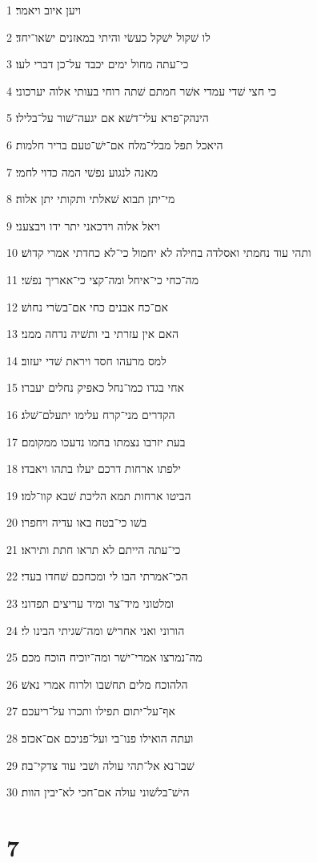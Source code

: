 \par 1 ויען איוב ויאמר׃
\par 2 לו שׁקול ישׁקל כעשׂי והיתי במאזנים ישׂאו־יחד׃
\par 3 כי־עתה מחול ימים יכבד על־כן דברי לעו׃
\par 4 כי חצי שׁדי עמדי אשׁר חמתם שׁתה רוחי בעותי אלוה יערכוני׃
\par 5 הינהק־פרא עלי־דשׁא אם יגעה־שׁור על־בלילו׃
\par 6 היאכל תפל מבלי־מלח אם־ישׁ־טעם בריר חלמות׃
\par 7 מאנה לנגוע נפשׁי המה כדוי לחמי׃
\par 8 מי־יתן תבוא שׁאלתי ותקותי יתן אלוה׃
\par 9 ויאל אלוה וידכאני יתר ידו ויבצעני׃
\par 10 ותהי עוד נחמתי ואסלדה בחילה לא יחמול כי־לא כחדתי אמרי קדושׁ׃
\par 11 מה־כחי כי־איחל ומה־קצי כי־אאריך נפשׁי׃
\par 12 אם־כח אבנים כחי אם־בשׂרי נחושׁ׃
\par 13 האם אין עזרתי בי ותשׁיה נדחה ממני׃
\par 14 למס מרעהו חסד ויראת שׁדי יעזוב׃
\par 15 אחי בגדו כמו־נחל כאפיק נחלים יעברו׃
\par 16 הקדרים מני־קרח עלימו יתעלם־שׁלג׃
\par 17 בעת יזרבו נצמתו בחמו נדעכו ממקומם׃
\par 18 ילפתו ארחות דרכם יעלו בתהו ויאבדו׃
\par 19 הביטו ארחות תמא הליכת שׁבא קוו־למו׃
\par 20 בשׁו כי־בטח באו עדיה ויחפרו׃
\par 21 כי־עתה הייתם לא תראו חתת ותיראו׃
\par 22 הכי־אמרתי הבו לי ומכחכם שׁחדו בעדי׃
\par 23 ומלטוני מיד־צר ומיד עריצים תפדוני׃
\par 24 הורוני ואני אחרישׁ ומה־שׁגיתי הבינו לי׃
\par 25 מה־נמרצו אמרי־ישׁר ומה־יוכיח הוכח מכם׃
\par 26 הלהוכח מלים תחשׁבו ולרוח אמרי נאשׁ׃
\par 27 אף־על־יתום תפילו ותכרו על־ריעכם׃
\par 28 ועתה הואילו פנו־בי ועל־פניכם אם־אכזב׃
\par 29 שׁבו־נא אל־תהי עולה ושׁבי עוד צדקי־בה׃
\par 30 הישׁ־בלשׁוני עולה אם־חכי לא־יבין הוות׃

\chapter{7}

